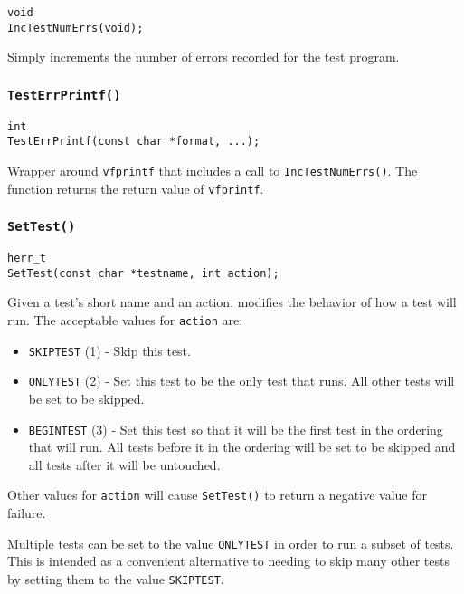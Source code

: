 \documentclass[../HDF5_RFC.tex]{subfiles}
\begin{document}
\begin{verbatim}
void
IncTestNumErrs(void);
\end{verbatim}

Simply increments the number of errors recorded for the test program.

\subsubsection{\texttt{TestErrPrintf()}}

\begin{verbatim}
int
TestErrPrintf(const char *format, ...);
\end{verbatim}

Wrapper around \texttt{vfprintf} that includes a call to \texttt{IncTestNumErrs()}. The function
returns the return value of \texttt{vfprintf}.

\subsubsection{\texttt{SetTest()}}

\begin{verbatim}
herr_t
SetTest(const char *testname, int action);
\end{verbatim}

Given a test's short name and an action, modifies the behavior of how a test will run. The acceptable
values for \texttt{action} are:

\begin{itemize}

    \item \texttt{SKIPTEST} (1) - Skip this test.
    \item \texttt{ONLYTEST} (2) - Set this test to be the only test that runs. All other tests will
          be set to be skipped.
    \item \texttt{BEGINTEST} (3) - Set this test so that it will be the first test in the ordering
          that will run. All tests before it in the ordering will be set to be skipped and all tests
          after it will be untouched.

\end{itemize}

Other values for \texttt{action} will cause \texttt{SetTest()} to return a negative value for failure.

Multiple tests can be set to the value \texttt{ONLYTEST} in order to run a subset of tests. This is
intended as a convenient alternative to needing to skip many other tests by setting them to the value
\texttt{SKIPTEST}.
\end{document}
